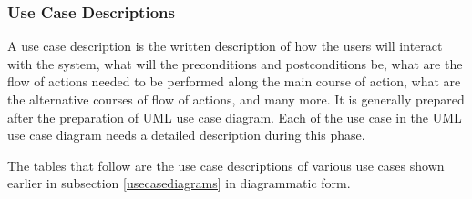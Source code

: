 \documentclass[12pt, a4paper, oneside]{article}
\begin{document}

\subsubsection{Use Case Descriptions}
A use case description is the written description of how the users will interact with the system, what will the preconditions and postconditions be, what are the flow of actions needed to be performed along the main course of action, what are the alternative courses of flow of actions, and many more. It is generally prepared after the preparation of UML use case diagram. Each of the use case in the UML use case diagram needs a detailed description during this phase.

The tables that follow are the use case descriptions of various use cases shown earlier in subsection \ref{usecasediagrams} in diagrammatic form.
\end{document}
